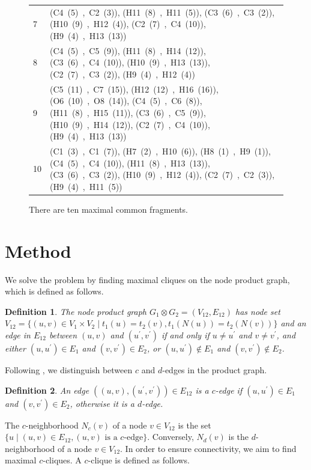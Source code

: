 \documentclass[11pt]{article}
\newtheorem{definition}{Definition}[section]
\begin{document}
\begin{figure}
{\begin{tabular}{|lp{}|}
      7 & (C4~(5)~,~C2~(3)), (H11~(8)~,~H11~(5)), (C3~(6)~,~C3~(2)), (H10~(9)~,~H12~(4)), (C2~(7)~,~C4~(10)), (H9~(4)~,~H13~(13))\\
      8 & (C4~(5)~,~C5~(9)), (H11~(8)~,~H14~(12)), (C3~(6)~,~C4~(10)), (H10~(9)~,~H13~(13)), (C2~(7)~,~C3~(2)), (H9~(4)~,~H12~(4))\\
      9 & (C5~(11)~,~C7~(15)), (H12~(12)~,~H16~(16)), (O6~(10)~,~O8~(14)), (C4~(5)~,~C6~(8)), (H11~(8)~,~H15~(11)), (C3~(6)~,~C5~(9)), (H10~(9)~,~H14~(12)), (C2~(7)~,~C4~(10)), (H9~(4)~,~H13~(13))\\
      10 &(C1~(3)~,~C1~(7)), (H7~(2)~,~H10~(6)), (H8~(1)~,~H9~(1)), (C4~(5)~,~C4~(10)), (H11~(8)~,~H13~(13)), (C3~(6)~,~C3~(2)), (H10~(9)~,~H12~(4)), (C2~(7)~,~C2~(3)), (H9~(4)~,~H11~(5))\\
      \hline
    \end{tabular}
  }
  \caption{There are ten maximal common fragments.}
  \label{fig:example}
\end{figure}

\section{Method}

We solve the problem by finding maximal cliques on the node product graph, which
is defined as follows.

\begin{definition}
The \emph{node product graph} $G_1 \otimes G_2 = (V_{12}, E_{12})$ has node
set $V_{12} = \{(u,v) \in V_1 \times V_2 \mid t_1(u) = t_2(v), 
t_1(N(u)) = t_2(N(v)) \}$ and an edge in $E_{12}$ between $(u,v)$ and
$(u^\prime,v^\prime)$ if and only if $u \neq u^\prime$ and $v \neq v^\prime$,
and either $(u,u^\prime) \in E_1$ and $(v,v^\prime) \in E_2$, or $(u,u^\prime)
\not \in E_1$ and $(v,v^\prime) \not \in E_2$.
\end{definition}

Following \cite{Koch:2001wi}, we distinguish between $c$ and $d$-edges in the
product graph.

\begin{definition}
An edge $((u,v),(u^\prime,v^\prime)) \in E_{12}$ is a \emph{$c$-edge} if
$(u,u^\prime) \in E_1$ and $(v,v^\prime) \in E_2$, otherwise it is a
\emph{$d$-edge}.
\end{definition}

The $c$-neighborhood $N_c(v)$ of a node $v \in V_{12}$ is the set $\{ u
\mid (u,v) \in E_{12}, (u,v) \mbox{ is a $c$-edge} \}$. Conversely, $N_d(v)$ is
the $d$-neighborhood of a node $v \in V_{12}$.
In order to ensure connectivity, we aim to
find maximal $c$-cliques. A $c$-clique is defined as follows.
\end{document}
